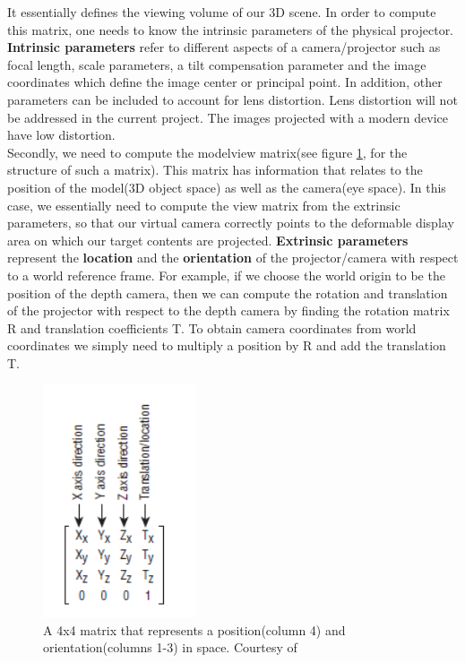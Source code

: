 \documentclass[]{article}
\begin{document}
It essentially defines the viewing volume of our 3D scene. In order to compute this matrix, one needs to know the intrinsic parameters of the physical projector.
\textbf{Intrinsic parameters} refer to different aspects of a camera/projector such as focal length, scale parameters, a tilt compensation parameter and the image coordinates which define the image center or principal point. In addition, other parameters can be included to account for lens distortion. Lens distortion will not be addressed in the current project. The images projected with a modern device have low distortion.\\

Secondly, we need to compute the modelview matrix(see figure \ref{fig:MVMatrix}, for the structure of such a matrix). This matrix has information that relates to the position of the model(3D object space) as well as the camera(eye space). In this case, we essentially need to compute the view matrix from the extrinsic parameters, so that our virtual camera correctly points to the deformable display area on which our target contents are projected. \textbf{Extrinsic parameters} represent the \textbf{location} and the \textbf{orientation} of the projector/camera with respect to a world reference frame. For example, if we choose the world origin to be the position of the depth camera, then we can compute the rotation and translation of the projector with respect to the depth camera by finding the rotation matrix R and translation coefficients T. To obtain camera coordinates from world coordinates we simply need to multiply a position by R and add the translation T.

\begin{figure}[hbtp]
    \centering
    \includegraphics[width=0.4\textwidth]{figures/MVMatrixOGLSB.PNG}
    \caption{A 4x4 matrix that represents a position(column 4) and orientation(columns 1-3) in space. Courtesy of \cite{superbible}}
    \label{fig:MVMatrix}
\end{figure}
\end{document}
